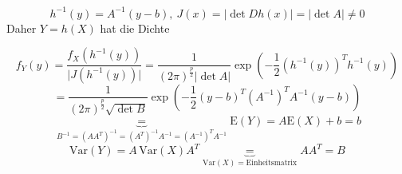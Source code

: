 \documentclass[12pt, a4paper]{article}
\newcommand{\E}{\mbox{I\negthinspace E}}
\theoremstyle{plain}
\theoremstyle{definition}
\newcommand{\1}{\mathds{1}}
\renewcommand{\E}{\mathrm{E}}
\newcommand{\Var}{\mathrm{Var}}
\providecommand{\abs}[1]{\lvert#1\rvert}
\begin{document}
\[  h^{-1} (y) = A^{-1} (y-b), \: J(x) = \abs{\det Dh(x)} = \abs{\det A}  \neq 0    \]
Daher $Y = h(X)$ hat die Dichte

\[    f_Y (y) = \frac{f_X (h^{-1}(y))}{\abs{J(h^{-1} (y))}} = \frac{1}{(2\pi)^{\frac{p}{2}}\abs{\det A}} \exp (-\frac{1}{2} (h^{-1}(y))^T h^{-1}(y))   \]
\[    = \frac{1}{(2\pi)^{\frac{p}{2}}\sqrt{\det B}} \exp (-\frac{1}{2} (y-b)^T (A^{-1})^T A^{-1} (y-b)  )         \]
\[ \underbrace{=}_{B^{-1} = (AA^{T})^{-1} = (A^{T})^{-1} A^{-1} = (A^{-1})^T A^{-1}} \E(Y) = A\E(X) + b = b   \]
\[ \Var(Y) = A\,\Var(X)A^T \underbrace{=}_{\Var(X) = \text{Einheitsmatrix}} AA^T = B   \]
\end{document}
